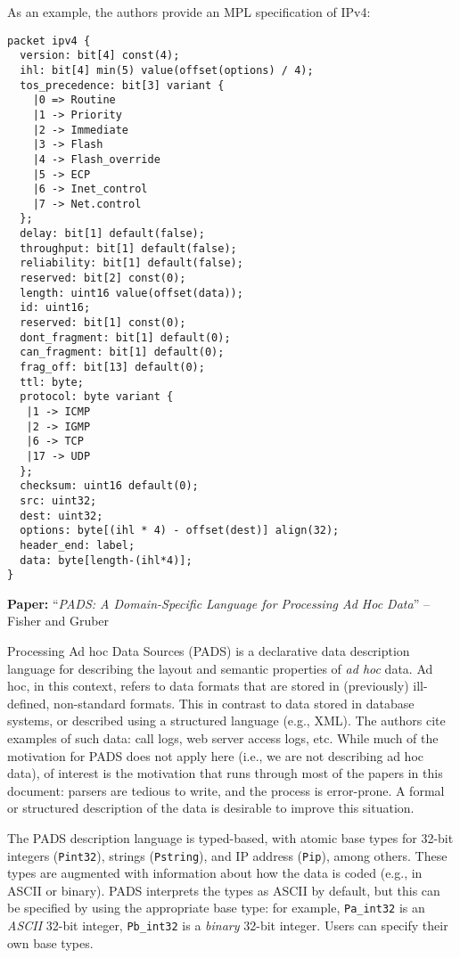 \documentclass[10pt]{article}
\newcommand{\paper}[3]{\vspace{4mm}\noindent\textbf{Paper:} ``\textit{#1}'' -- #2 \cite{#3}\vspace{3mm}}
\begin{document}
As an example, the authors provide an MPL specification of IPv4:

\begin{verbatim}
packet ipv4 {
  version: bit[4] const(4);
  ihl: bit[4] min(5) value(offset(options) / 4);
  tos_precedence: bit[3] variant {
    |0 => Routine
    |1 -> Priority
    |2 -> Immediate
    |3 -> Flash
    |4 -> Flash_override
    |5 -> ECP
    |6 -> Inet_control
    |7 -> Net.control
  };
  delay: bit[1] default(false);
  throughput: bit[1] default(false);
  reliability: bit[1] default(false);
  reserved: bit[2] const(0);
  length: uint16 value(offset(data));
  id: uint16;
  reserved: bit[1] const(0);
  dont_fragment: bit[1] default(0);
  can_fragment: bit[1] default(0);
  frag_off: bit[13] default(0);
  ttl: byte;
  protocol: byte variant {
   |1 -> ICMP
   |2 -> IGMP
   |6 -> TCP
   |17 -> UDP
  };
  checksum: uint16 default(0);
  src: uint32;
  dest: uint32;
  options: byte[(ihl * 4) - offset(dest)] align(32);
  header_end: label;
  data: byte[length-(ihl*4)];
}
\end{verbatim}

\paper{PADS: A Domain-Specific Language for Processing Ad Hoc Data}{Fisher and Gruber}{fisher2005pads}

Processing Ad hoc Data Sources (PADS) is a declarative data description language for
describing the layout and semantic properties of \emph{ad hoc} data. Ad hoc, in this
context, refers to data formats that are stored in (previously) ill-defined, non-standard
formats. This in contrast to data stored in database systems, or described using a
structured language (e.g., XML). The authors cite examples of such data: call logs, web
server access logs, etc. While much of the motivation for PADS does not apply here (i.e.,
we are not describing ad hoc data), of interest is the motivation that runs through most
of the papers in this document: parsers are tedious to write, and the process is
error-prone. A formal or structured description of the data is desirable to improve this
situation.

The PADS description language is typed-based, with atomic base types for 32-bit integers
(\texttt{Pint32}), strings (\texttt{Pstring}), and IP address (\texttt{Pip}), among
others. These types are augmented with information about how the data is coded (e.g., in
ASCII or binary). PADS interprets the types as ASCII by default, but this can be specified
by using the appropriate base type: for example, \texttt{Pa\_int32} is an \emph{ASCII}
32-bit integer, \texttt{Pb\_int32} is a \emph{binary} 32-bit integer. Users can specify
their own base types.
\end{document}

